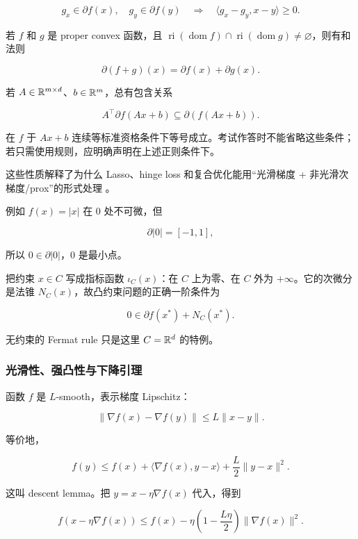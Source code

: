 \[
  g_x\in\partial f(x),\quad g_y\in\partial f(y)
  \quad\Longrightarrow\quad
  \langle g_x-g_y,x-y\rangle\ge0.
\]

若 \(f\) 和 \(g\) 是 proper convex 函数，且
\(\operatorname{ri}(\operatorname{dom}f)\cap\operatorname{ri}(\operatorname{dom}g)\ne\varnothing\)，则有和法则

\[
  \partial(f+g)(x)
  =
  \partial f(x)+\partial g(x).
\]

若 \(A\in\mathbb{R}^{m\times d}\)、\(b\in\mathbb{R}^m\)，总有包含关系

\[
  A^\top\partial f(Ax+b)
  \subseteq
  \partial(f(Ax+b)).
\]

在 \(f\) 于 \(Ax+b\) 连续等标准资格条件下等号成立。考试作答时不能省略这些条件；若只需使用规则，应明确声明在上述正则条件下。

这些性质解释了为什么 Lasso、hinge loss 和复合优化能用“光滑梯度 + 非光滑次梯度/prox”的形式处理 \parencite{nesterov2018convex,beck2017first}。

例如 \(f(x)=|x|\) 在 \(0\) 处不可微，但

\[
  \partial |0|=[-1,1],
\]

所以 \(0\in\partial |0|\)，\(0\) 是最小点。

\begin{example}[约束与法锥]
把约束 \(x\in C\) 写成指标函数 \(\iota_C(x)\)：在 \(C\) 上为零、在 \(C\) 外为 \(+\infty\)。它的次微分是法锥 \(N_C(x)\)，故凸约束问题的正确一阶条件为

\[
  0\in\partial f(x^*)+N_C(x^*).
\]

无约束的 Fermat rule 只是这里 \(C=\mathbb{R}^d\) 的特例。
\end{example}

\subsubsection{光滑性、强凸性与下降引理}


函数 \(f\) 是 \(L\)-smooth，表示梯度 Lipschitz：

\[
  \|\nabla f(x)-\nabla f(y)\|
  \le
  L\|x-y\|.
\]

等价地，

\[
  f(y)
  \le
  f(x)+\langle\nabla f(x),y-x\rangle
  +\frac{L}{2}\|y-x\|^2.
\]

这叫 descent lemma。把 \(y=x-\eta\nabla f(x)\) 代入，得到

\[
  f(x-\eta\nabla f(x))
  \le
  f(x)
  -
  \eta\left(1-\frac{L\eta}{2}\right)
  \|\nabla f(x)\|^2.
\]

